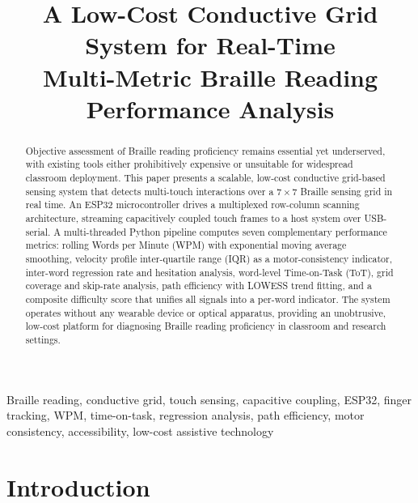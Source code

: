 \documentclass[conference]{IEEEtran}
\begin{document}
    \title{A Low-Cost Conductive Grid System for Real-Time\\
    Multi-Metric Braille Reading Performance Analysis}



    \maketitle

    \begin{abstract}
    Objective assessment of Braille reading proficiency remains essential
    yet underserved, with existing tools either prohibitively expensive or
    unsuitable for widespread classroom deployment. This paper presents a
    scalable, low-cost conductive grid-based sensing system that detects
    multi-touch interactions over a $7\times7$ Braille sensing grid in
    real time. An ESP32 microcontroller drives a multiplexed row-column
    scanning architecture, streaming capacitively coupled touch frames to
    a host system over USB-serial. A multi-threaded Python pipeline
    computes seven complementary performance metrics: rolling Words per
    Minute (WPM) with exponential moving average smoothing, velocity
    profile inter-quartile range (IQR) as a motor-consistency indicator,
    inter-word regression rate and hesitation analysis, word-level
    Time-on-Task (ToT), grid coverage and skip-rate analysis, path
    efficiency with LOWESS trend fitting, and a composite difficulty score
    that unifies all signals into a per-word indicator. The system
    operates without any wearable device or optical apparatus, providing
    an unobtrusive, low-cost platform for diagnosing Braille reading
    proficiency in classroom and research settings.
    \end{abstract}

    \begin{IEEEkeywords}
    Braille reading, conductive grid, touch sensing, capacitive coupling,
    ESP32, finger tracking, WPM, time-on-task, regression analysis, path
    efficiency, motor consistency, accessibility, low-cost assistive
    technology
    \end{IEEEkeywords}

    \section{Introduction}
    \label{sec:intro}
\end{document}
